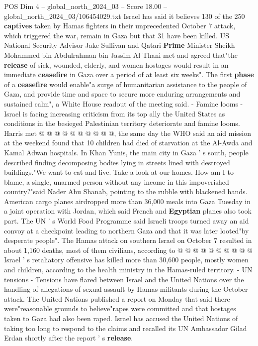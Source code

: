 \begin{textsample}{POS Dim 4 – global\_north\_2024\_03 – Score 18.00 – global\_north\_2024\_03/106454029.txt}
Israel has said it believes 130 of the 250 \textbf{captives} taken by Hamas fighters in their unprecedented October 7 attack, which triggered the war, remain in Gaza but that 31 have been killed.
US National Security Advisor Jake Sullivan and Qatari \textbf{Prime} Minister Sheikh Mohammed bin Abdulrahman bin Jassim Al Thani met and agreed that"the \textbf{release} of sick, wounded, elderly, and women hostages would result in an immediate \textbf{ceasefire} in Gaza over a period of at least six weeks".
The first \textbf{phase} of a \textbf{ceasefire} would enable"a surge of humanitarian assistance to the people of Gaza, and provide time and space to secure more enduring arrangements and sustained calm", a White House readout of the meeting said. - Famine looms - Israel is facing increasing criticism from its top ally the United States as conditions in the besieged Palestinian territory deteriorate and famine looms.
Harris met @ @ @ @ @ @ @ @ @ @, the same day the WHO said an aid mission at the weekend found that 10 children had died of starvation at the Al-Awda and Kamal Adwan hospitals.
In Khan Yunis, the main city in Gaza ' s south, people described finding decomposing bodies lying in streets lined with destroyed buildings."We want to eat and live.
Take a look at our homes.
How am I to blame, a single, unarmed person without any income in this impoverished country?"said Nader Abu Shanab, pointing to the rubble with blackened hands.
American cargo planes airdropped more than 36,000 meals into Gaza Tuesday in a joint operation with Jordan, which said French and \textbf{Egyptian} planes also took part.
The UN ' s World Food Programme said Israeli troops turned away an aid convoy at a checkpoint leading to northern Gaza and that it was later looted"by desperate people".
The Hamas attack on southern Israel on October 7 resulted in about 1,160 deaths, most of them civilians, according to @ @ @ @ @ @ @ @ @ @ Israel ' s retaliatory offensive has killed more than 30,600 people, mostly women and children, according to the health ministry in the Hamas-ruled territory. - UN tensions - Tensions have flared between Israel and the United Nations over the handling of allegations of sexual assault by Hamas militants during the October attack.
The United Nations published a report on Monday that said there were"reasonable grounds to believe"rapes were committed and that hostages taken to Gaza had also been raped.
Israel has accused the United Nations of taking too long to respond to the claims and recalled its UN Ambassador Gilad Erdan shortly after the report ' s \textbf{release}.

\end{textsample}
